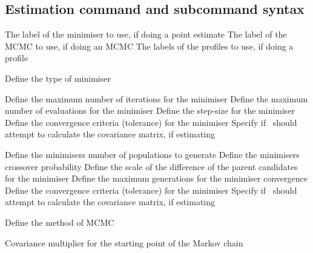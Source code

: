 \subsection{Estimation command and subcommand syntax}\par
{}\par\par
{} {The label of the minimiser to use, if doing a point estimate}
 {The label of the MCMC to use, if doing an MCMC}
 {The labels of the profiles to use, if doing a profile}
\par{}\par\par
{} {Define the type of minimiser}
\par\textbf{}\par
{} {Define the maximum number of iterations for the minimiser}
 {Define the maximum number of evaluations for the minimiser}
 {Define the step-size for the minimiser}
 {Define the convergence criteria (tolerance) for the minimiser}
 {Specify if \SPM\ should attempt to calculate the covariance matrix, if estimating}
\par\textbf{}\par
{} {Define the minimisers number of populations to generate}
 {Define the minimisers crossover probability }
 {Define the scale of the difference of the parent candidates for the minimiser}
 {Define the maximum generations for the minimiser convergence}
 {Define the convergence criteria (tolerance) for the minimiser}
 {Specify if \SPM\ should attempt to calculate the covariance matrix, if estimating}
\par{}\par\par
{} {Define the method of MCMC}
\par\textbf{}\par
{} {Covariance multiplier for the starting point of the Markov chain}
